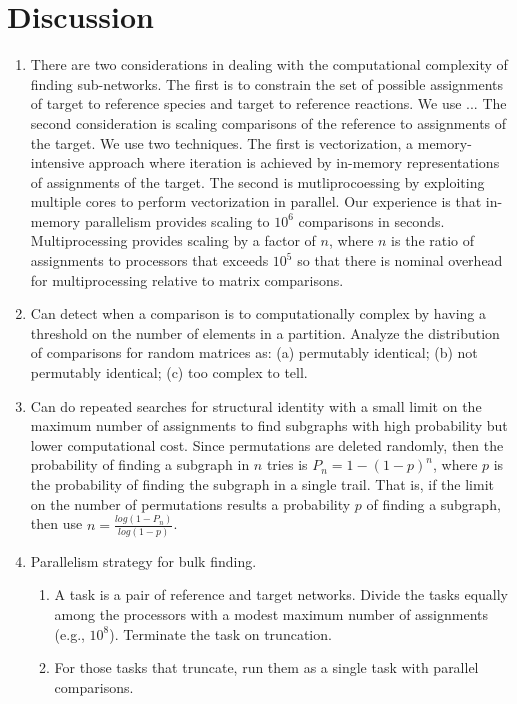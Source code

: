 \documentclass{article}
\begin{document}
\section{Discussion}
\begin{enumerate}
    \item There are two considerations in dealing with the computational complexity of finding sub-networks. The first is to constrain the set of possible assignments of target to reference species and target to reference reactions. We use ...
    The second consideration is scaling comparisons of the reference to assignments of the target. We use two techniques. The first is vectorization, a memory-intensive approach where iteration is achieved by in-memory representations of assignments of the target. The second is mutliprocoessing by exploiting multiple cores to perform vectorization in parallel. Our experience is that in-memory parallelism provides scaling to $10^6$ comparisons in seconds. Multiprocessing provides scaling by a factor of $n$, where $n$ is the ratio of assignments to processors that exceeds $10^5$ so that there is nominal overhead for multiprocessing relative to matrix comparisons.
    
    \item Can detect when a comparison is to computationally complex by having a threshold on the number of elements in a partition. Analyze the distribution of comparisons for random matrices as: (a) permutably identical; (b) not permutably identical; (c) too complex to tell.

    \item Can do repeated searches for structural identity with a small limit on the maximum number of assignments to find subgraphs with high probability but lower computational cost. Since permutations are deleted randomly, then the probability of finding a subgraph in $n$ tries is $P_n = 1 - (1 - p)^n$, where $p$ is the probability of finding the subgraph in a single trail. That is, if the limit on the number of permutations results a probability $p$ of finding a subgraph, then use $n = \frac{log (1 - P_n)}{log(1 - p)}$.

    \item Parallelism strategy for bulk finding.
    \begin{enumerate}
        \item A task is a pair of reference and target networks. Divide the tasks equally among the processors with a modest maximum number of assignments (e.g., $10^8$). Terminate the task on truncation.
        \item For those tasks that truncate, run them as a single task with parallel comparisons.
    \end{enumerate}
\end{enumerate}
\end{document}
